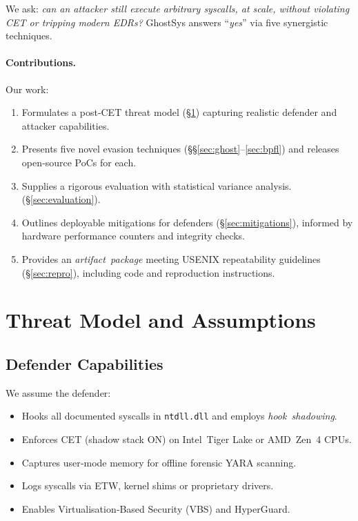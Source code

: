 \documentclass[11pt,letterpaper]{article}
\begin{document}
We ask: \emph{can an attacker still execute arbitrary syscalls, at scale, without violating CET or tripping modern EDRs?} GhostSys answers “\emph{yes}” via five synergistic techniques.

\paragraph{Contributions.} Our work:
\begin{enumerate}
  \item Formulates a post‑CET threat model (§\ref{sec:threat}) capturing realistic defender and attacker capabilities.
  \item Presents five novel evasion techniques (§§\ref{sec:ghost}–\ref{sec:bpfl}) and releases open‑source PoCs for each.
  \item Supplies a rigorous evaluation with statistical variance analysis. (§\ref{sec:evaluation}).
  \item Outlines deployable mitigations for defenders (§\ref{sec:mitigations}), informed by hardware performance counters and integrity checks.
  \item Provides an \emph{artifact package} meeting USENIX repeatability guidelines (§\ref{sec:repro}), including code and reproduction instructions.
\end{enumerate}

\section{Threat Model and Assumptions}
\label{sec:threat}
\subsection{Defender Capabilities}
We assume the defender:
\begin{itemize}
  \item Hooks all documented syscalls in \texttt{ntdll.dll} and employs \emph{hook shadowing}.
  \item Enforces CET (shadow stack ON) on Intel Tiger Lake or AMD Zen 4 CPUs.
  \item Captures user‑mode memory for offline forensic YARA scanning.
  \item Logs syscalls via ETW, kernel shims or proprietary drivers.
  \item Enables Virtualisation‑Based Security (VBS) and HyperGuard.
\end{itemize}
\end{document}
